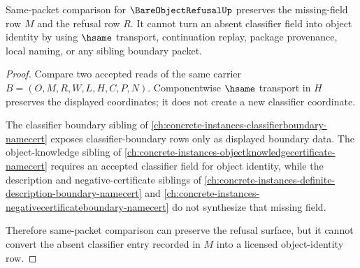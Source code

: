 \begin{theorem}
\label{thm:bare-object-refusal-obligation-classifier}
Same-packet comparison for $\BareObjectRefusalUp$ preserves the missing-field row $M$ and the refusal row $R$. It cannot turn an absent classifier field into object identity by using $\hsame$ transport, continuation replay, package provenance, local naming, or any sibling boundary packet.
\end{theorem}
\begin{proof}
Compare two accepted reads of the same carrier $B=(O,M,R,W,L,H,C,P,N)$. Componentwise $\hsame$ transport in $H$ preserves the displayed coordinates; it does not create a new classifier coordinate.

The classifier boundary sibling of \autoref{ch:concrete-instances-classifierboundary-namecert} exposes classifier-boundary rows only as displayed boundary data. The object-knowledge sibling of \autoref{ch:concrete-instances-objectknowledgecertificate-namecert} requires an accepted classifier field for object identity, while the description and negative-certificate siblings of \autoref{ch:concrete-instances-definite-description-boundary-namecert} and \autoref{ch:concrete-instances-negativecertificateboundary-namecert} do not synthesize that missing field.

Therefore same-packet comparison can preserve the refusal surface, but it cannot convert the absent classifier entry recorded in $M$ into a licensed object-identity row.
\end{proof}

